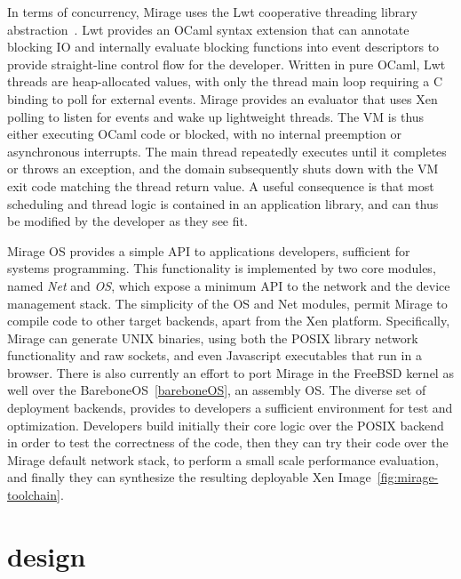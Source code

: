 In terms of concurrency, Mirage uses  the Lwt cooperative threading library
abstraction~\cite{lwt}. Lwt provides an OCaml syntax extension that can annotate
blocking IO and internally evaluate blocking functions into event
descriptors to provide straight-line control ﬂow for the developer.  Written in
pure OCaml, Lwt threads are heap-allocated values, with only the thread main
loop requiring a C binding to poll for external events.  Mirage provides an
evaluator that uses Xen polling to listen for events and wake up lightweight
threads. The VM is thus either executing OCaml code or blocked, with no internal
preemption or asynchronous interrupts. The main thread repeatedly executes until
it completes or throws an exception, and the domain subsequently shuts down with
the VM exit code matching the thread return value.  A useful consequence is that
most scheduling and thread logic is contained in an application library, and can
thus be modified by the developer as they see fit. 

Mirage OS provides a simple API to applications developers, sufficient for
systems programming. This functionality is implemented by two core modules,
named \textit{Net} and \textit{OS}, which expose a minimum API to the network
and the device management stack.  The simplicity of the OS and Net modules,
permit Mirage to compile code to other target backends, apart from the Xen
platform. Specifically, Mirage can generate UNIX binaries, using both the POSIX
library network functionality and raw sockets, and even Javascript executables
that run in a browser. There is also currently an effort to port Mirage in the
FreeBSD kernel as well over the BareboneOS~\ref{bareboneOS}, an assembly OS. The
diverse set of deployment backends, provides to developers a sufficient
environment for test and optimization. Developers build initially their core
logic over the POSIX backend in order to test the correctness of the code, then
they can try their code over the Mirage default network stack, to perform a
small scale performance evaluation, and finally they can synthesize the
resulting deployable Xen Image~\ref{fig:mirage-toolchain}.


\section{\sdnsim design} \label{sec:sdnsim-design}

